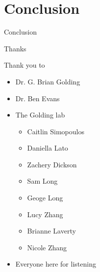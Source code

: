 \documentclass[dvipsnames]{beamer}
\begin{document}
\section*{Conclusion}
\begin{frame}[fragile]{}
    \begin{center}
        \Huge \textcolor{OliveGreen}{Conclusion}
    \end{center}
    \addtocounter{framenumber}{-1}
\end{frame}
\begin{frame}{Thanks}
    \begin{multicols}{2}
    \begin{minipage}[b][40ex][t]{\linewidth}
    Thank you to
    \begin{itemize}
        \item Dr. G. Brian Golding
        \item Dr. Ben Evans
        \item The Golding lab
            \begin{itemize}
                \item Caitlin Simopoulos
                \item Daniella Lato
                \item Zachery Dickson
                \item Sam Long
                \item Geoge Long
                \item Lucy Zhang
                \item Brianne Laverty
                \item Nicole Zhang
            \end{itemize}
        \item Everyone here for listening
    \end{itemize}
    \end{minipage}
    \begin{minipage}[b][20ex][t]{\linewidth}
    \begin{figure}[htb!]

\end{figure}
\end{minipage}
\end{multicols}
\end{frame}
\end{document}
